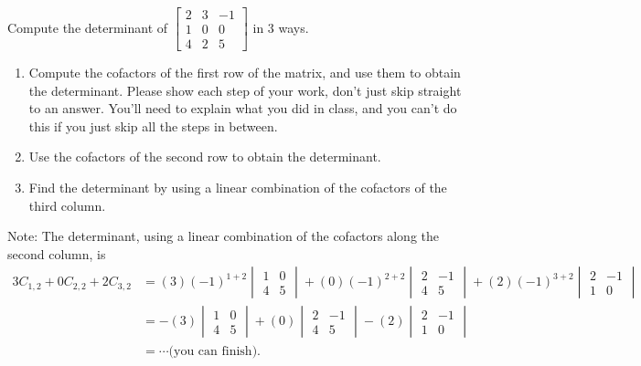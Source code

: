 \begin{problem}
 Compute the determinant of 
$
\begin{bmatrix}
 2 & 3 & -1 \\
 1 & 0 & 0 \\
 4 & 2 & 5
\end{bmatrix}
$
in 3 ways. 
\begin{enumerate}
 \item 
{}%
Compute the cofactors of the first row of the matrix, and use them to obtain the determinant. Please show each step of your work, don't just skip straight to an answer. You'll need to explain what you did in class, and you can't do this if you just skip all the steps in between.
 \item Use the cofactors of the second row to obtain the determinant.
 \item Find the determinant by using a linear combination of the cofactors of the third column. 
\end{enumerate}
Note: The determinant, using a linear combination of the cofactors along the second column, is
\begin{align*}
3C_{1,2}+0C_{2,2}+2C_{3,2} 
&= (3)(-1)^{1+2}\begin{vmatrix}1&0\\4&5\end{vmatrix}+(0)(-1)^{2+2}\begin{vmatrix}2&-1\\4&5\end{vmatrix}+(2)(-1)^{3+2}\begin{vmatrix}2&-1\\1&0\end{vmatrix}\\
&= -(3)\begin{vmatrix}1&0\\4&5\end{vmatrix}+(0)\begin{vmatrix}2&-1\\4&5\end{vmatrix}-(2)\begin{vmatrix}2&-1\\1&0\end{vmatrix}\\
&=\cdots \text{(you can finish).}
\end{align*}
\end{problem}




